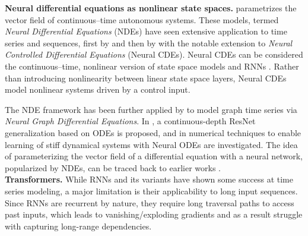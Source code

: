 \textbf{Neural differential equations as nonlinear state spaces.}
%
\citep{chen2018neural} parametrizes the vector field of continuous--time autonomous systems. These models, termed \textit{Neural Differential Equations} (NDEs) have seen extensive application to time series and sequences, first by \cite{rubanova2019latent} and then by \cite{kidger2020neural,morrill2021neural,massaroli2021differentiable} with the notable extension to \textit{Neural Controlled Differential Equations} (Neural CDEs). Neural CDEs can be considered the continuous--time, nonlinear version of state space models and RNNs \citep{kidger2022neural}. Rather than introducing nonlinearity between linear state space layers, Neural CDEs model nonlinear systems driven by a control input. 

The NDE framework has been further applied by \cite{poli2019graph} to model graph time series via \textit{Neural Graph Differential Equations}. In \cite{queiruga2020continuous}, a continuous-depth ResNet generalization based on ODEs is proposed, and in \cite{kim2021stiff} numerical techniques to enable learning of stiff dynamical systems with Neural ODEs are investigated. The idea of parameterizing the vector field of a differential equation with a neural network, popularized by NDEs, can be traced back to earlier works \citep{funahashi1993approximation, zhang2014comprehensive, weinan2017proposal}. \\



\textbf{Transformers.} 
While RNNs and its variants have shown some success at time series modeling, a major limitation is their applicability to long input sequences. Since RNNs are recurrent by nature, they require long traversal paths to access past inputs, which leads to vanishing/exploding gradients and as a result struggle with capturing long-range dependencies. 


